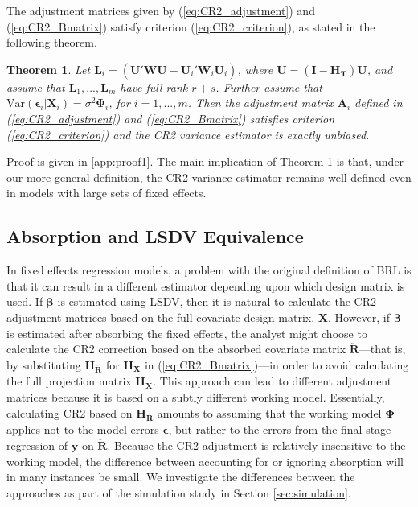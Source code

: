 \documentclass[12pt]{article}
\newtheorem{thm}{Theorem}
\begin{document}
The adjustment matrices given by (\ref{eq:CR2_adjustment}) and
(\ref{eq:CR2_Bmatrix}) satisfy criterion (\ref{eq:CR2_criterion}), as
stated in the following theorem.

\begin{thm}
\label{thm:BRL_FE}
Let $\mathbf{L}_i = \left(\mathbf{\ddot{U}}'\mathbf{W}\mathbf{\ddot{U}} - \mathbf{\ddot{U}}_i'\mathbf{W}_i\mathbf{\ddot{U}}_i\right)$, where $\mathbf{\ddot{U}} = \left(\mathbf{I} - \mathbf{H_T}\right)\mathbf{U}$, and assume that $\mathbf{L}_1,...,\mathbf{L}_m$ have full rank $r + s$. Further assume that $\text{Var}\left(\boldsymbol\epsilon_i\left|\mathbf{X}_i\right.\right) = \sigma^2 \boldsymbol\Phi_i$, for $i = 1,...,m$. Then the adjustment matrix $\mathbf{A}_i$ defined in (\ref{eq:CR2_adjustment}) and (\ref{eq:CR2_Bmatrix}) satisfies criterion (\ref{eq:CR2_criterion}) and the CR2 variance estimator is exactly unbiased.
\end{thm}

Proof is given in \ref{app:proof1}. The main implication of Theorem
\ref{thm:BRL_FE} is that, under our more general definition, the CR2
variance estimator remains well-defined even in models with large sets
of fixed effects.

\hypertarget{absorption-and-lsdv-equivalence}{%
\subsection{Absorption and LSDV
Equivalence}\label{absorption-and-lsdv-equivalence}}

In fixed effects regression models, a problem with the original
definition of BRL is that it can result in a different estimator
depending upon which design matrix is used. If \(\boldsymbol\beta\) is
estimated using LSDV, then it is natural to calculate the CR2 adjustment
matrices based on the full covariate design matrix, \(\mathbf{X}\).
However, if \(\boldsymbol\beta\) is estimated after absorbing the fixed
effects, the analyst might choose to calculate the CR2 correction based
on the absorbed covariate matrix \(\mathbf{\ddot{R}}\)---that is, by
substituting \(\mathbf{H_{\ddot{R}}}\) for \(\mathbf{H_X}\) in
(\ref{eq:CR2_Bmatrix})---in order to avoid calculating the full
projection matrix \(\mathbf{H_X}\). This approach can lead to different
adjustment matrices because it is based on a subtly different working
model. Essentially, calculating CR2 based on \(\mathbf{H_{\ddot{R}}}\)
amounts to assuming that the working model \(\boldsymbol\Phi\) applies
not to the model errors \(\boldsymbol\epsilon\), but rather to the
errors from the final-stage regression of \(\mathbf{\ddot{y}}\) on
\(\mathbf{\ddot{R}}\). Because the CR2 adjustment is relatively
insensitive to the working model, the difference between accounting for
or ignoring absorption will in many instances be small. We investigate
the differences between the approaches as part of the simulation study
in Section \ref{sec:simulation}.
\end{document}
